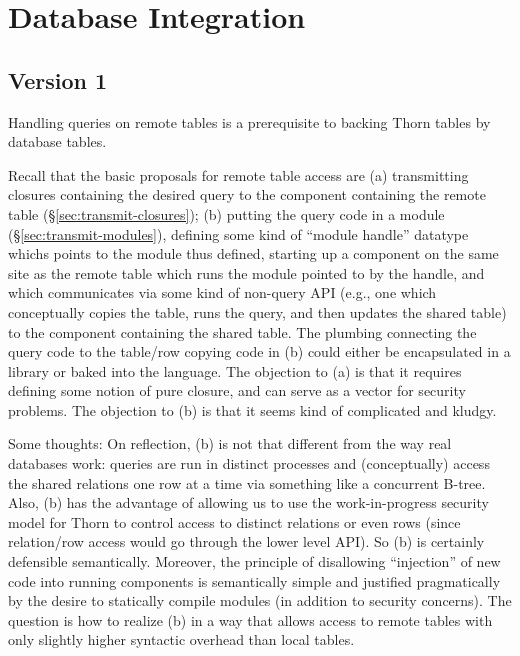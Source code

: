 \section{Database Integration}

\subsection{Version 1}
Handling queries on remote tables is a prerequisite to backing Thorn tables by database tables.

Recall that the basic proposals for remote table access are (a) transmitting closures containing the desired query to the component containing the remote table (\S\ref{sec:transmit-closures}); (b) putting the query code in a module (\S\ref{sec:transmit-modules}), defining some kind of ``module handle'' datatype whichs points to the module thus defined, starting up a component on the same site as the remote table which runs the module pointed to by the handle, and which communicates via some kind of non-query API (e.g., one which conceptually copies the table, runs the query, and then updates the shared table) to the component containing the shared table.  The plumbing connecting the query code to the table/row copying code in (b) could either be encapsulated in a library or baked into the language.  The objection to (a) is that it requires defining some notion of pure closure, and can serve as a vector for security problems.  The objection to (b) is that it seems kind of complicated and kludgy.

Some thoughts: On reflection, (b) is not that different from the way real databases work: queries are run in distinct processes and (conceptually) access the shared relations one row at a time via something like a concurrent B-tree.  Also, (b) has the advantage of allowing us to use the work-in-progress security model for Thorn to control access to distinct relations or even rows (since relation/row access would go through the lower level API).  So (b) is certainly defensible semantically.  Moreover, the principle of disallowing ``injection'' of new code into running components is semantically simple and justified pragmatically by the desire to statically compile modules (in addition to security concerns).  The question is how to realize (b) in a way that allows access to remote tables with only slightly higher syntactic overhead than local tables.


